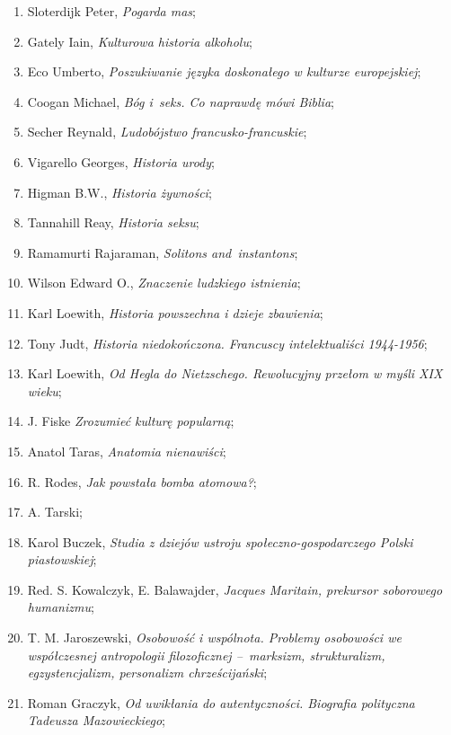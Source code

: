 \documentclass[a4paper,11pt]{article}
\begin{document}
\begin{enumerate}
\item Sloterdijk Peter, \emph{Pogarda mas};
\item Gately Iain, \emph{Kulturowa historia alkoholu};
\item Eco Umberto, \emph{Poszukiwanie języka doskonałego w kulturze
    europejskiej};
\item Coogan Michael, \emph{Bóg i~seks. Co naprawdę mówi Biblia};
\item Secher Reynald, \emph{Ludobójstwo francusko-francuskie};
\item Vigarello Georges, \emph{Historia urody};
\item Higman B.W., \emph{Historia żywności};
\item Tannahill Reay, \emph{Historia seksu};
\item Ramamurti Rajaraman, \emph{Solitons and~instantons};
\item Wilson Edward O., \emph{Znaczenie ludzkiego istnienia};
\item Karl Loewith, \emph{Historia powszechna i dzieje zbawienia};
\item Tony Judt, \emph{Historia niedokończona. Francuscy
    intelektualiści 1944-1956};
\item Karl Loewith, \emph{Od Hegla do Nietzschego. Rewolucyjny przełom
    w myśli XIX wieku};
\item J. Fiske \emph{Zrozumieć kulturę popularną};
\item Anatol Taras, \emph{Anatomia nienawiści};
\item R. Rodes, \emph{Jak powstała bomba atomowa?};
\item A. Tarski;
\item Karol Buczek, \emph{Studia z dziejów ustroju
    społeczno-gospodarczego Polski piastowskiej};
\item Red. S. Kowalczyk, E. Balawajder, \emph{Jacques Maritain,
    prekursor soborowego humanizmu};
\item T. M. Jaroszewski, \emph{Osobowość i wspólnota. Problemy
    osobowości we współczesnej antropologii filozoficznej --~marksizm,
    strukturalizm, egzystencjalizm, personalizm chrześcijański};
\item Roman Graczyk, \emph{Od uwikłania do autentyczności. Biografia
    polityczna Tadeusza Mazowieckiego};

\end{enumerate}
\end{document}
